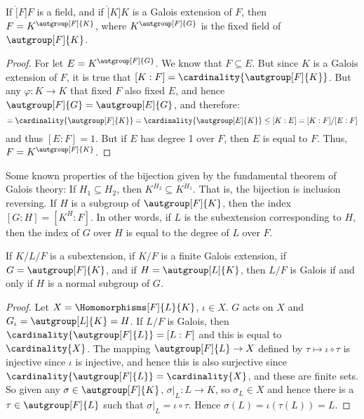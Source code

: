     \begin{theorem}
        If $\ring[F]{F}$ is a field, and if $\ring[K]{K}$ is a Galois
        extension of $F$, then $F=K^{\autgroup[F]{K}}$, where
        $K^{\autgroup[F]{G}}$ is the fixed field of $\autgroup[F]{K}$.
    \end{theorem}
    \begin{proof}
        For let $E=K^{\autgroup[F]{G}}$. We know that $F\subseteq{E}$.
        But since $K$ is a Galois extension of $F$, it is true that
        $[K:F]=\cardinality{\autgroup[F]{K}}$. But any
        $\varphi:K\rightarrow{K}$ that fixed $F$ also fixed $E$, and hence
        $\autgroup[F]{G}=\autgroup[E]{G}$, and therefore:
        \begin{equation}
            [K:F]=\cardinality{\autgroup[F]{K}}
                =\cardinality{\autgroup[E]{K}}
                \leq[K:E]=[K:F]/[E:F]
        \end{equation}
        and thus $[E:F]=1$. But if $E$ has degree 1 over $F$, then
        $E$ is equal to $F$. Thus, $F=K^{\autgroup[F]{K}}$.
    \end{proof}
    Some known properties of the bijection given by the fundamental theorem
    of Galois theory: If $H_{1}\subseteq{H}_{2}$, then
    $K^{H_{2}}\subseteq{K}^{H_{1}}$. That is, the bijection is inclusion
    reversing. If $H$ is a subgroup of $\autgroup[F]{K}$, then
    the index $[G:H]=[K^{H}:F]$. In other words, if $L$ is the
    subextension corresponding to $H$, then the index of $G$ over $H$ is
    equal to the degree of $L$ over $F$.
    \begin{theorem}
        If $K/L/F$ is a subextension, if $K/F$ is a finite Galois extension,
        if $G=\autgroup[F]{K}$, and if $H=\autgroup[L]{K}$, then
        $L/F$ is Galois if and only if $H$ is a normal subgroup of $G$.
    \end{theorem}
    \begin{proof}
        Let $X=\Homomorphisms[F]{L}{K}$, $\iota\in{X}$. $G$ acts on $X$ and
        $G_{\iota}=\autgroup[L]{K}=H$. If $L/F$ is Galois, then
        $\cardinality{\autgroup[F]{L}}=[L:F]$ and this is equal to
        $\cardinality{X}$. The mapping $\autgroup[F]{L}\rightarrow{X}$
        defined by $\tau\mapsto\iota\circ\tau$ is injective since $\iota$
        is injective, and hence this is also surjective since
        $\cardinality{\autgroup[F]{L}}=\cardinality{X}$, and these are
        finite sets. So given any $\sigma\in\autgroup[F]{K}$,
        $\sigma|_{L}:L\rightarrow{K}$, so $\sigma_{L}\in{X}$ and hence
        there is a $\tau\in\autgroup[F]{L}$ such that
        $\sigma|_{L}=\iota\circ\tau$. Hence $\sigma(L)=\iota(\tau(L))=L$.
    \end{proof}
